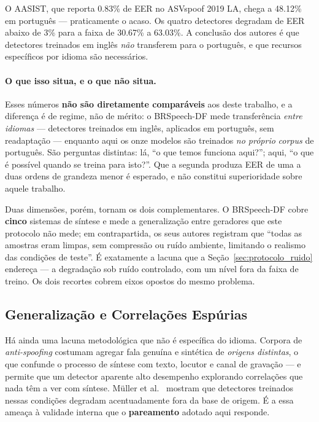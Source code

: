 \documentclass[12pt,a4paper]{article}
\begin{document}
O AASIST, que reporta \num{0,83}\% de EER no ASVspoof 2019 LA, chega a
\num{48,12}\% em português --- praticamente o acaso. Os quatro detectores
degradam de EER abaixo de \num{3}\% para a faixa de \num{30,67}\% a
\num{63,03}\%. A conclusão dos autores é que detectores treinados em inglês
\emph{não} transferem para o português, e que recursos específicos por idioma
são necessários.

\paragraph{O que isso situa, e o que não situa.} Esses números
\textbf{não são diretamente comparáveis} aos deste trabalho, e a diferença é de
regime, não de mérito: o BRSpeech-DF mede transferência \emph{entre idiomas} ---
detectores treinados em inglês, aplicados em português, sem readaptação ---
enquanto aqui os onze modelos são treinados \emph{no próprio} \textit{corpus}
de
português. São perguntas distintas: lá, ``o que temos funciona aqui?''; aqui,
``o que é possível quando se treina para isto?''. Que a segunda produza EER de
uma a duas ordens de grandeza menor é esperado, e não constitui superioridade
sobre aquele trabalho.

Duas dimensões, porém, tornam os dois complementares. O BRSpeech-DF cobre
\textbf{cinco} sistemas de síntese e mede a generalização entre geradores que
este protocolo não mede; em contrapartida, os seus autores registram que ``todas
as amostras eram limpas, sem compressão ou ruído ambiente, limitando o realismo
das condições de teste''. É exatamente a lacuna que a
Seção~\ref{sec:protocolo_ruido} endereça --- a degradação sob ruído controlado,
com um nível fora da faixa de treino. Os dois recortes cobrem eixos opostos do
mesmo problema.

\subsection{Generalização e Correlações Espúrias}
\label{sec:generalizacao}

Há ainda uma lacuna metodológica que não é específica do idioma. Corpora de
\textit{anti-spoofing} costumam agregar fala genuína e sintética de
\emph{origens distintas}, o que confunde o processo de síntese com texto,
locutor e canal de gravação --- e permite que um detector aparente alto
desempenho explorando correlações que nada têm a ver com síntese. Müller et
al.~\cite{muller2022does} mostram que detectores treinados nessas condições
degradam acentuadamente fora da base de origem. É a essa ameaça à validade
interna que o \textbf{pareamento} adotado aqui responde.
\end{document}
